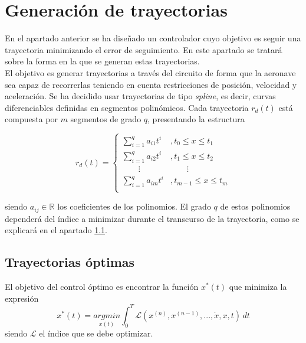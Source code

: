\chapter{Generación de trayectorias}

En el apartado anterior se ha diseñado un controlador cuyo objetivo es seguir una trayectoria  minimizando el error de seguimiento. En este apartado se tratará sobre la forma en la que se generan estas trayectorias.\\

El objetivo es generar trayectorias a través del circuito de forma que la aeronave sea capaz de recorrerlas teniendo en cuenta restricciones de posición, velocidad y aceleración.
 Se ha decidido usar trayectorias de tipo \textit{spline}, es decir, curvas diferenciables definidas en segmentos polinómicos. Cada trayectoria $r_d(t)$ está compuesta por $m$ segmentos de grado $q$, presentando la estructura

\begin{equation}
	r_d(t) = \left\{ 
	\begin{array}{ll}
		\sum_{i=1}^{q}a_{i1}t^{i} &,t_0\leq x \leq t_1 \\
		\sum_{i=1}^{q}a_{i2}t^{i} &,t_1\leq x \leq t_2 \\
		\qquad\vdots &\qquad\vdots \\
		\sum_{i=1}^{q}a_{im}t^{i} &,t_{m-1}\leq x \leq t_m \\
	\end{array}
	\right.
\end{equation}

siendo $a_{ij}\in \mathbb{R}$ los coeficientes de los polinomios. El grado $q$ de estos polinomios dependerá del índice a minimizar durante el transcurso de la trayectoria, como se explicará en el apartado \ref{trajectoriasoptimas:cap}.


\section{Trayectorias óptimas}\label{trajectoriasoptimas:cap}
El objetivo del control óptimo es encontrar la función $x^*(t)$ que minimiza la expresión
\begin{equation}
	x^*(t) =  \underset{x(t)}{argmin}\int_{0}^{T}\mathcal{L}\left(x^{(n)},x^{(n-1)},...,\dot{x},x,t\right)\, dt
\end{equation}
siendo $\mathcal{L}$ el índice que se debe optimizar.


